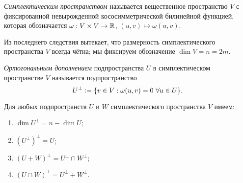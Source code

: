 \begin{definition}
    \textit{Симплектическим пространством} называется вещественное пространство $V$ с фиксированной невырожденной кососимметрической билинейной функцией, которая обозначается $\omega: V \times V \to \mathbb{R}$, $(u, v) \mapsto \omega(u, v)$.
\end{definition}

Из последнего следствия вытекает, что размерность симплектического пространства $V$ всегда чётна; мы фиксируем обозначение $\dim V = n = 2m$.

\begin{definition}
    \textit{Ортогональным дополнением} подпространства $U$ в симплектическом пространстве $V$ называется подпространство
    \[
        U^\perp \vcentcolon = \{v \in V : \omega(u, v) = 0\ \forall u \in U\}.
    \]
\end{definition}

\begin{proposal}
    Для любых подпространств $U$ и $W$ симплектического пространства $V$ имеем:
    \begin{enumerate}[nolistsep]
        \item $\dim U^\perp = n - \dim U$;
        \item $(U^\perp)^\perp = U$;
        \item $(U + W)^\perp = U^\perp \cap W^\perp$;
        \item $(U \cap W)^\perp = U^\perp + W^\perp$.
    \end{enumerate}
\end{proposal}

